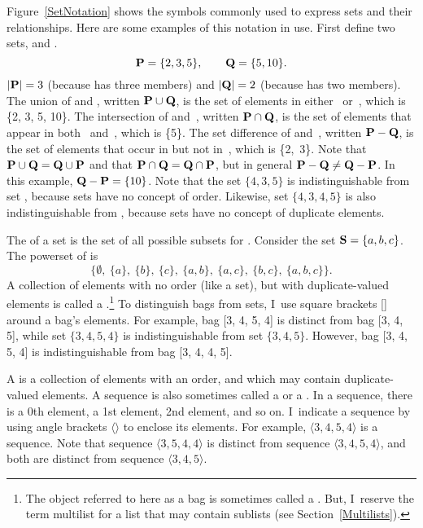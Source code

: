 Figure~\ref{SetNotation} shows the symbols commonly used to express sets
and their relationships.
Here are some examples of this notation in use.
First define two sets,  and .
\[ {\textbf{P}} = \{2, 3, 5\}, \qquad {\textbf{Q}} = \{5, 10\}. \]
\noindent \(|{\textbf{P}}| = 3\)  (because  has three members) and
\(|{\textbf{Q}}| = 2\) (because  has two members).
The union
of  and , written
\( {\textbf{P}} \cup {\textbf{Q}} \), is the set of elements in either~
or~, which is \{2, 3, 5, 10\}.
The intersection of  and~,
written \( {\textbf{P}} \cap {\textbf{Q}} \), is the set of elements that
appear in both~ and~, which is \{5\}.
The set difference of  and~,
written \( {\textbf{P}} - {\textbf{Q}} \),
is the set of elements that occur in  but not in~, which
is \{2,~3\}.
Note that \( {\textbf{P}} \cup {\textbf{Q}} = {\textbf{Q}} \cup {\textbf{P}} \) and that
\( {\textbf{P}} \cap {\textbf{Q}} = {\textbf{Q}} \cap {\textbf{P}} \), but in general
\( {\textbf{P}} - {\textbf{Q}} \neq {\textbf{Q}} - {\textbf{P}} \).
In this example,
\( {\textbf{Q}} - {\textbf{P}}  = \{10\} \).
Note that the set \( \{4, 3, 5\} \) is indistinguishable from set
, because sets have no concept of order.
Likewise, set \(\{4, 3, 4, 5\}\) is also indistinguishable from 
, because sets have no concept of duplicate elements.

The  of a set  is the set of all
possible subsets for .
Consider the set \( {\textbf{S}} = \{ a, b, c \}\).
The powerset of  is
\[ \{ \emptyset,\ \{a\},\ \{b\},\ \{c\},\ \{a, b\},
\ \{a, c\},\ \{b, c\},\ \{a, b, c\}\}.\]
A collection of elements with no order (like a set), but with
duplicate-valued elements is called a
.\footnote{The object referred to here as a
bag is sometimes called a .
But, I~reserve the term multilist for a list that may contain sublists
(see Section~\ref{Multilists}).}
To distinguish bags from sets, I~use square brackets [] around
a bag's elements.
For example, bag [3, 4, 5, 4] is distinct from bag [3, 4, 5],
while set \(\{3, 4, 5, 4\}\) is indistinguishable from set
\(\{3, 4, 5\}\).
However, bag [3, 4, 5, 4] is indistinguishable from bag
[3, 4, 4, 5].

A  is a collection of elements with an order, and
which may contain duplicate-valued elements.
A sequence is also sometimes called a  or a
.
In a sequence, there is a 0th element, a 1st element, 2nd element, and 
so on.
I~indicate a sequence by using angle brackets \(\langle\rangle\)
to enclose its elements.
For example, \(\langle3, 4, 5, 4\rangle\) is a sequence.
Note that sequence \(\langle3, 5, 4, 4\rangle\) is distinct from
sequence \(\langle3, 4, 5, 4\rangle\), and both are distinct from
sequence \(\langle3, 4, 5\rangle\). 

